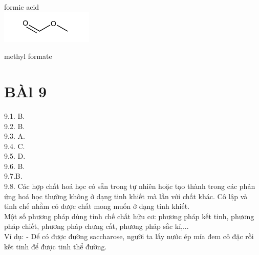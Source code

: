 \documentclass[10pt]{article}
\begin{document}
formic acid\\
\includegraphics{smile-11bdff789f95735f92506e97e848eb5871f1919b}

methyl formate

\section*{BÀl 9}
9.1. B.\\
9.2. B.\\
9.3. A.\\
9.4. C.\\
9.5. D.\\
9.6. B.\\
9.7.B.\\
9.8. Các hợp chất hoá học có sẵn trong tự nhiên hoặc tạo thành trong các phản ứng hoá học thường không ở dạng tinh khiết mà lẫn với chất khác. Cô lập và tinh chế nhằm có được chất mong muốn ở dạng tinh khiết.\\
Một số phương pháp dùng tinh chế chất hữu cơ: phương pháp kết tinh, phương pháp chiết, phương pháp chưng cất, phương pháp sắc kí,...\\
Ví dụ: - Dể có được đường saccharose, người ta lấy nước ép mía đem cô đặc rồi kết tinh để được tinh thể đường.
\end{document}
